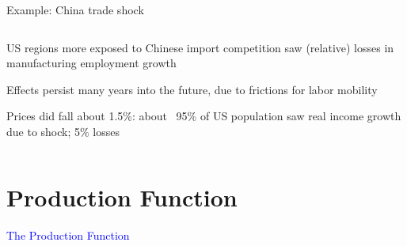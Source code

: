 \documentclass[notes,11pt, aspectratio=169, xcolor=table]{beamer}
\newcommand{\blue}[1]{\textcolor{blue}{#1}}
\newenvironment{wideitemize}{\itemize\addtolength{\itemsep}{10pt}}{\enditemize}
\begin{document}
\begin{frame}{Example: China trade shock}
\begin{columns}[T]
\begin{column}{.55\textwidth}
{\begin{wideitemize}
    \item<2-> US regions more exposed to Chinese import competition saw (relative) losses in manufacturing employment growth

    \item<3-> Effects persist many years into the future, due to frictions for labor mobility

    \item<4-> Prices did fall about 1.5\%: about ~95\% of US population saw real income growth due to shock; 5\% losses 

    
\end{wideitemize}
}
\end{column}%
\end{columns}

\end{frame}



\section{Production Function}

\begin{frame}{}
\addtocounter{framenumber}{-1}

\Huge \blue{The Production Function}
\end{frame}
\end{document}
